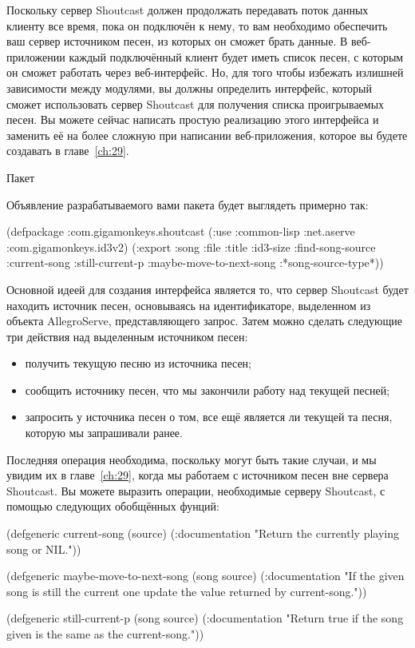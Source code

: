 Поскольку сервер Shoutcast должен продолжать передавать поток данных клиенту все время,
пока он подключён к нему, то вам необходимо обеспечить ваш сервер источником песен, из
которых он сможет брать данные.  В веб-приложении каждый подключённый клиент будет иметь
список песен, с которым он сможет работать через веб-интерфейс.  Но, для того чтобы
избежать излишней зависимости между модулями, вы должны определить интерфейс, который
сможет использовать сервер Shoutcast для получения списка проигрываемых песен. Вы можете
сейчас написать простую реализацию этого интерфейса и заменить её на более сложную при
написании веб-приложения, которое вы будете создавать в главе~\ref{ch:29}.

Пакет

Объявление разрабатываемого вами пакета будет выглядеть примерно так:

\begin{myverb}
(defpackage :com.gigamonkeys.shoutcast
  (:use :common-lisp 
        :net.aserve 
        :com.gigamonkeys.id3v2)
  (:export :song
           :file
           :title
           :id3-size
           :find-song-source
           :current-song
           :still-current-p
           :maybe-move-to-next-song
           :*song-source-type*))
\end{myverb}


Основной идеей для создания интерфейса является то, что сервер Shoutcast будет находить
источник песен, основываясь на идентификаторе, выделенном из объекта AllegroServe,
представляющего запрос.  Затем можно сделать следующие три действия над выделенным
источником песен:
\begin{itemize}
\item получить текущую песню из источника песен;
\item сообщить источнику песен, что мы закончили работу над текущей песней;
\item запросить у источника песен о том, все ещё является ли текущей та песня, которую мы
  запрашивали ранее.
\end{itemize}

Последняя операция необходима, поскольку могут быть такие случаи, и мы увидим их в
главе~\ref{ch:29}, когда мы работаем с источником песен вне сервера Shoutcast.  Вы можете
выразить операции, необходимые серверу Shoutcast, с помощью следующих обобщённых фунций:

\begin{myverb}
(defgeneric current-song (source)
  (:documentation "Return the currently playing song or NIL."))

(defgeneric maybe-move-to-next-song (song source)
  (:documentation
   "If the given song is still the current one update the value
returned by current-song."))

(defgeneric still-current-p (song source)
  (:documentation
   "Return true if the song given is the same as the current-song."))
\end{myverb}

